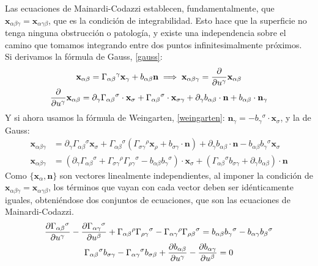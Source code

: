 Las ecuaciones de Mainardi-Codazzi establecen, fundamentalmente, que $\mathbf{x}_{\alpha \beta \gamma}=\mathbf{x}_{\alpha \gamma \beta }$, que es la condición de integrabilidad. Esto hace que la superficie no tenga ninguna obstrucción o patología, y existe una independencia sobre el camino que tomamos integrando entre dos puntos infinitesimalmente próximos. \\

Si derivamos la fórmula de Gauss, \ref{gauss}:
\begin{gather*}
    \mathbf{x}_{\alpha \beta }=\Gamma _{\alpha \beta }{}^\gamma \mathbf{x}_\gamma +b_{\alpha \beta }\mathbf{n}\implies \mathbf{x}_{\alpha \beta \gamma }=\pdv{}{u^\gamma }\mathbf{x}_{\alpha \beta }\\
    \pdv{}{u^\gamma }\mathbf{x}_{\alpha \beta }=\partial_\gamma \Gamma_{\alpha \beta}{}^\sigma \cdot \mathbf{x}_\sigma +\Gamma_{\alpha \beta}{}^\sigma \cdot \mathbf{x}_{\sigma \gamma }+\partial_\gamma b_{\alpha \beta }\cdot \mathbf{n}+b_{\alpha \beta }\cdot \mathbf{n}_\gamma
\end{gather*}
Y si ahora usamos la fórmula de Weingarten, \ref{weingarten}: $\mathbf{n}_\gamma =-b_\gamma {}^\sigma  \cdot \mathbf{x}_\sigma $, y la de Gauss:
\begin{equation*}
    \begin{split}
        \mathbf{x}_{\alpha \beta \gamma }&=\partial_\gamma \Gamma _{\alpha \beta }{}^\sigma \mathbf{x}_\sigma +\Gamma _{\alpha \beta }{}^\sigma \left ( \Gamma _{\sigma \gamma }{}^\rho \mathbf{x}_\rho +b_{\sigma \gamma }\cdot \mathbf{n} \right )+\partial_\gamma b_{\alpha \beta }\cdot \mathbf{n}-b_{\alpha \beta }b_\gamma {}^\sigma \mathbf{x}_\sigma \\
        \mathbf{x}_{\alpha \beta \gamma  }&=\left ( \partial_\gamma \Gamma _{\alpha \beta }{}^\sigma+ \Gamma _{\sigma \gamma }{}^\rho \Gamma _{\rho \gamma }{}^\sigma -b_{\alpha \beta} b_\gamma {}^\sigma \right )\cdot \mathbf{x}_\sigma +\left ( \Gamma _{\alpha \beta } {}^\sigma b_{\sigma \gamma }+\partial_\gamma b_{\alpha \beta } \right )  \cdot \mathbf{n}
    \end{split}
\end{equation*}
Como $\{ \mathbf{x}_\alpha ,\mathbf{n} \}$ son vectores linealmente independientes, al imponer la condición de $\mathbf{x}_{\alpha \beta \gamma }=\mathbf{x}_{\alpha \gamma \beta }$, los términos que vayan con cada vector deben ser idénticamente iguales, obteniéndose dos conjuntos de ecuaciones, que son las ecuaciones de Mainardi-Codazzi.
\begin{gather*}
    \pdv{\Gamma_{\alpha \beta }{}^\sigma }{u^\gamma }-\pdv{\Gamma _{\alpha \gamma }{}^\sigma }{u^\beta }+\Gamma _{\alpha \beta} {}^\rho\Gamma _{\rho \gamma }{}^\sigma -\Gamma _{\alpha \gamma }{}^\rho \Gamma _{\rho \beta }{}^\sigma =b_{\alpha \beta }b_\gamma {}^\sigma -b_{\alpha \gamma }b_\beta {}^\sigma \\
    \Gamma _{\alpha \beta }{}^\sigma b_{\sigma \gamma }-\Gamma _{\alpha \gamma }{}^\sigma b_{\sigma \beta }+\pdv{b_{\alpha \beta }}{u^\gamma }-\pdv{b_{\alpha \gamma }}{u^\beta }=0
\end{gather*}
